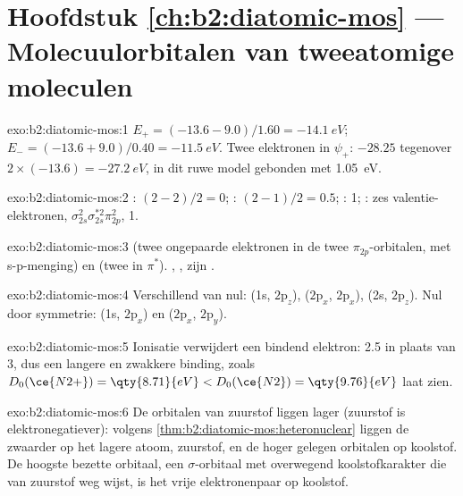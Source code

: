 \section*{Hoofdstuk \ref{ch:b2:diatomic-mos} --- Molecuulorbitalen van tweeatomige moleculen}

\begin{solution}{exo:b2:diatomic-mos:1}
$E_+ = (-13.6 - 9.0)/1.60 = \qty{-14.1}{eV}$; $E_- = (-13.6 + 9.0)/0.40 = \qty{-11.5}{eV}$.
Twee elektronen in $\psi_+$: $-28.25$ tegenover $2 \times (-13.6) = \qty{-27.2}{eV}$, in dit
ruwe model gebonden met \qty{1.05}{eV}.
\end{solution}

\begin{solution}{exo:b2:diatomic-mos:2}
: $(2 - 2)/2 = 0$; : $(2 - 1)/2 = 0.5$; : 1; : zes valentie-elektronen,
$\sigma_{2s}^2\sigma_{2s}^{*2}\pi_{2p}^2$,  1.
\end{solution}

\begin{solution}{exo:b2:diatomic-mos:3}
 (twee ongepaarde elektronen in de twee $\pi_{2p}$-orbitalen, met s-p-menging) en
 (twee in $\pi^*$). , ,  zijn .
\end{solution}

\begin{solution}{exo:b2:diatomic-mos:4}
Verschillend van nul: (1s, $2\mathrm p_z$), ($2\mathrm p_x$, $2\mathrm p_x$), (2s, $2\mathrm p_z$).
Nul door symmetrie: (1s, $2\mathrm p_x$) en ($2\mathrm p_x$, $2\mathrm p_y$).
\end{solution}

\begin{solution}{exo:b2:diatomic-mos:5}
Ionisatie verwijdert een bindend elektron:  2.5 in plaats van 3, dus een langere en
zwakkere binding, zoals $D_0(\ce{N2+}) = \qty{8.71}{eV} < D_0(\ce{N2}) = \qty{9.76}{eV}$ laat zien.
\end{solution}

\begin{solution}{exo:b2:diatomic-mos:6}
De orbitalen van zuurstof liggen lager (zuurstof is elektronegatiever): volgens
\cref{thm:b2:diatomic-mos:heteronuclear} liggen de  zwaarder op het
lagere atoom, zuurstof, en de hoger gelegen orbitalen op koolstof. De hoogste bezette
orbitaal, een $\sigma$-orbitaal met overwegend koolstofkarakter die van zuurstof weg wijst, is
het vrije elektronenpaar op koolstof.
\end{solution}

